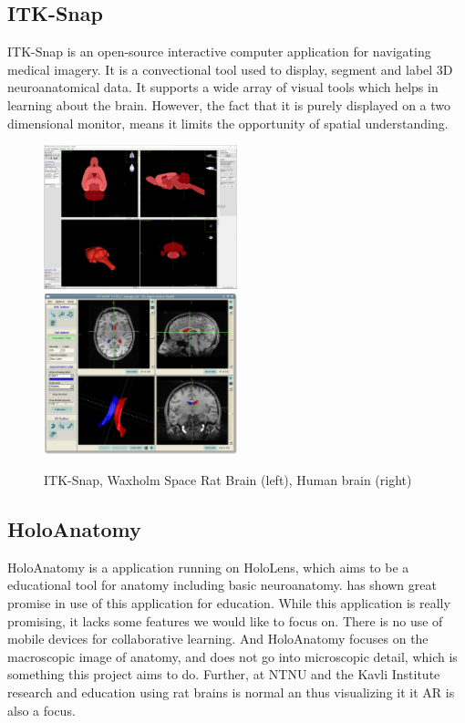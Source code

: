 \subsection*{ITK-Snap}

ITK-Snap is an open-source interactive computer application for navigating medical imagery. It is a convectional tool used to display, segment and label 3D neuroanatomical data. It supports a wide array of visual tools which helps in learning about the brain.
However, the fact that it is purely displayed on a two dimensional monitor, means it limits the opportunity of spatial understanding.

\begin{figure}[ht]
    \includegraphics[width=0.5\textwidth]{fig/itk_snap}
    \includegraphics[width=0.5\textwidth]{fig/itk_snap_example}
    \caption{ITK-Snap, Waxholm Space Rat Brain (left), Human brain (right)}
\end{figure}

\subsection*{HoloAnatomy}

HoloAnatomy is a application running on HoloLens, which aims to be a educational tool for anatomy including basic neuroanatomy. \citet{Wish2020} has shown great promise in use of this application for education. While this application is really promising, it lacks some features we would like to focus on. There is no use of mobile devices for collaborative learning. And HoloAnatomy focuses on the macroscopic image of anatomy, and does not go into microscopic detail, which is something this project aims to do. Further, at NTNU and the Kavli Institute research and education using rat brains is normal an thus visualizing it it AR is also a focus.

